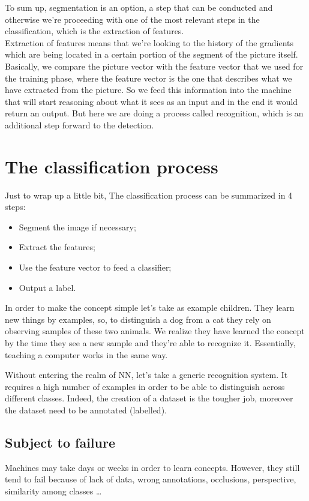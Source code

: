 To sum up, segmentation is an option, a step that can be conducted and otherwise we're proceeding with one of the most relevant steps in the classification, which is the extraction of features.
\\
Extraction of features means that we're looking to the history of the gradients which are being located in a certain portion of the segment of the picture itself.
Basically, we compare the picture vector with the feature vector that we used for the training phase, where the feature vector is the one that describes what we have extracted from the picture.
So we feed this information into the machine that will start reasoning about what it sees as an input and in the end it would return an output.
But here we are doing a process called recognition, which is an additional step forward to the detection.
\section{The classification process}
Just to wrap up a little bit, The classification process can be summarized in 4 steps:
\begin{itemize}
    \item Segment the image if necessary;
    \item Extract the features;
    \item Use the feature vector to feed a classifier;
    \item Output a label.
\end{itemize}
In order to make the concept simple let's take as example children. They learn new things by examples, so, to distinguish a dog from a cat they rely on observing samples of these two animals. 
We realize they have learned the concept by the time they see a new sample and they’re able to recognize it.
Essentially, teaching a computer works in the same way.

Without entering the realm of NN, let's take a generic recognition system. It requires a high number of examples in order to be able to distinguish across different classes.
Indeed, the creation of a dataset is the tougher job, moreover the dataset need to be annotated (labelled).
\subsection{Subject to failure}
Machines may take days or weeks in order to learn concepts. However, they still tend to fail because of lack of data, wrong annotations, occlusions, perspective, similarity among classes \dots

